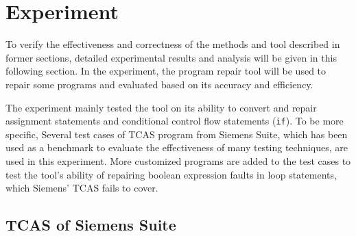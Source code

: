 \section{Experiment}
To verify the effectiveness and correctness of the methods and tool described in former sections, detailed experimental results and analysis will be given in this following section.
In the experiment, the program repair tool will be used to repair some programs and evaluated based on its accuracy and efficiency.

The experiment mainly tested the tool on its ability to convert and repair assignment statements and conditional control flow statements (\lstinline|if|).
To be more specific, Several test cases of TCAS program from Siemens Suite, which has been used as a benchmark to evaluate the effectiveness of many testing techniques, are used in this experiment. More customized programs are added to the test cases to test the tool's ability of repairing boolean expression faults in loop statements, which Siemens' TCAS fails to cover.

\subsection{TCAS of Siemens Suite}
